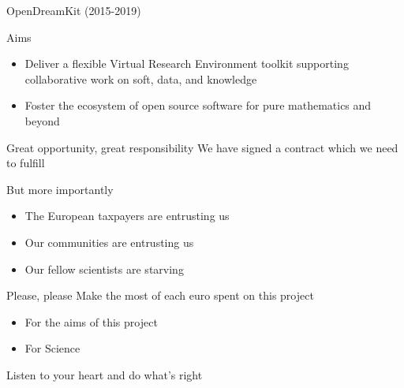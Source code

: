 \documentclass[
  usenames,svgnames, %
  compress,
  ]{beamer}
\begin{document}
\begin{frame}{OpenDreamKit (2015-2019)}
  \begin{block}{Aims}
    \begin{itemize}
    \item Deliver a flexible Virtual Research Environment toolkit
      supporting collaborative work on soft, data, and knowledge
      \pause
    \item Foster the ecosystem of open source software for pure
      mathematics and beyond
    \end{itemize}
  \end{block}

\end{frame}

\begin{frame}{Great opportunity, great responsibility}
  We have signed a contract which we need to fulfill
  \pause

  \begin{block}{But more importantly}
    \begin{itemize}
    \item The European taxpayers are entrusting us
    \item Our communities are entrusting us
    \item Our fellow scientists are starving
    \end{itemize}
  \end{block}
  \pause

  \begin{block}{Please, please}
    {\Large Make the most of each euro spent on this project}
    \begin{itemize}
    \item For the aims of this project
    \item For Science
    \end{itemize}
  \end{block}

  \bigskip
  \pause

  \centerline{\Large Listen to your heart and do what's right}
\end{frame}
\end{document}
